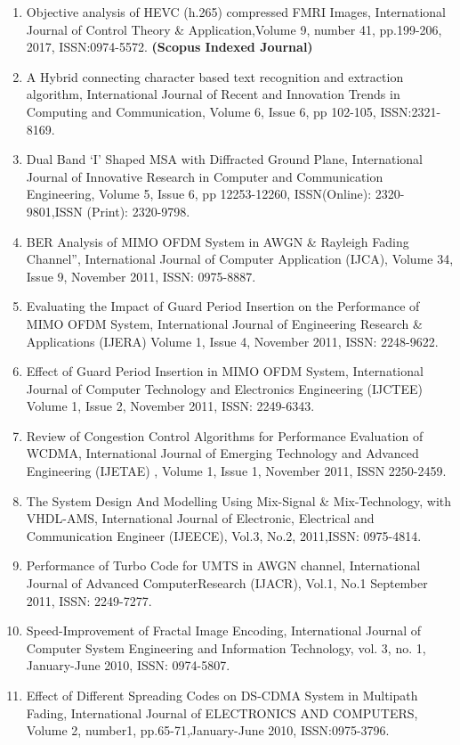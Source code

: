 \begin{enumerate}
	

	\item Objective analysis of HEVC (h.265) compressed FMRI Images, International Journal of Control Theory \& Application,Volume 9, number 41, pp.199-206, 2017, ISSN:0974-5572. \textbf{(Scopus Indexed Journal)}
	
	\item A Hybrid connecting character based text recognition and extraction algorithm, International Journal of Recent and Innovation Trends in Computing and Communication, Volume 6, Issue 6, pp 102-105, ISSN:2321-8169.
	
	\item Dual Band ‘I’ Shaped MSA with Diffracted
	Ground Plane, International Journal of Innovative Research in Computer and Communication Engineering, Volume 5, Issue 6, pp 12253-12260, ISSN(Online): 2320-9801,ISSN (Print): 2320-9798.
	
	\item BER Analysis of MIMO OFDM System in AWGN \& Rayleigh Fading Channel”, International Journal of Computer Application (IJCA), Volume 34, Issue 9, November 2011, ISSN: 0975-8887.
		
	\item Evaluating the Impact of Guard Period Insertion on the Performance of MIMO OFDM System, International Journal of Engineering Research \& Applications (IJERA) Volume 1, Issue 4, November 2011, ISSN: 2248-9622.
	
	\item Effect of Guard Period Insertion in MIMO OFDM System, International Journal of Computer Technology and Electronics Engineering (IJCTEE) Volume 1, Issue 2, November 2011, ISSN: 2249-6343.
	\item Review of Congestion Control Algorithms for Performance Evaluation of WCDMA, International Journal of Emerging Technology and Advanced Engineering (IJETAE) , Volume 1, Issue 1, November 2011, ISSN 2250-2459.
	
	\item The System Design And Modelling Using Mix-Signal \& Mix-Technology, with VHDL-AMS, International Journal of Electronic, Electrical and Communication Engineer (IJEECE), Vol.3, No.2, 2011,ISSN: 0975-4814.
	
	\item Performance of Turbo Code for UMTS in AWGN channel, International Journal of Advanced ComputerResearch (IJACR), Vol.1, No.1 September 2011, ISSN: 2249-7277.
	
	\item Speed-Improvement of Fractal Image Encoding, International Journal of Computer System Engineering and 
	Information Technology, vol. 3, no. 1, January-June 2010, ISSN: 0974-5807.
	
	\item Effect of Different Spreading Codes on DS-CDMA System in Multipath Fading, International Journal of ELECTRONICS AND COMPUTERS, Volume 2, number1, pp.65-71,January-June 2010, ISSN:0975-3796.
	
\end{enumerate}

